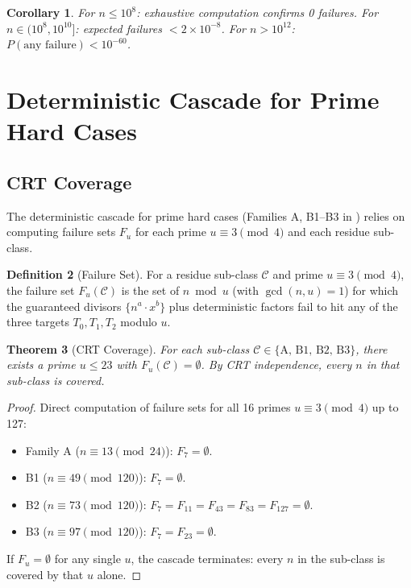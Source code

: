 \documentclass[11pt,a4paper]{article}
\theoremstyle{plain}
\newtheorem{theorem}{Theorem}[section]
\newtheorem{corollary}[theorem]{Corollary}
\theoremstyle{plain}
\theoremstyle{definition}
\newtheorem{definition}[theorem]{Definition}
\numberwithin{equation}{section}
\begin{document}
\begin{corollary}
For $n \leq 10^8$: exhaustive computation confirms 0 failures. For $n \in (10^8, 10^{10}]$: expected failures $< 2 \times 10^{-8}$. For $n > 10^{12}$: $P(\text{any failure}) < 10^{-60}$.
\end{corollary}

\section{Deterministic Cascade for Prime Hard Cases}

\subsection{CRT Coverage}

The deterministic cascade for prime hard cases (Families A, B1--B3 in ) relies on computing failure sets $F_u$ for each prime $u \equiv 3 \pmod{4}$ and each residue sub-class.

\begin{definition}[Failure Set]
For a residue sub-class $\mathcal{C}$ and prime $u \equiv 3 \pmod{4}$, the failure set $F_u(\mathcal{C})$ is the set of $n \bmod u$ (with $\gcd(n, u) = 1$) for which the guaranteed divisors $\{n^a \cdot x^b\}$ plus deterministic factors fail to hit any of the three targets $T_0, T_1, T_2$ modulo $u$.
\end{definition}

\begin{theorem}[CRT Coverage]\label{thm:crt}
For each sub-class $\mathcal{C} \in \{\text{A, B1, B2, B3}\}$, there exists a prime $u \leq 23$ with $F_u(\mathcal{C}) = \emptyset$. By CRT independence, every $n$ in that sub-class is covered.
\end{theorem}

\begin{proof}
Direct computation of failure sets for all 16 primes $u \equiv 3 \pmod{4}$ up to 127:
\begin{itemize}[noitemsep]
  \item Family A ($n \equiv 13 \pmod{24}$): $F_7 = \emptyset$.
  \item B1 ($n \equiv 49 \pmod{120}$): $F_7 = \emptyset$.
  \item B2 ($n \equiv 73 \pmod{120}$): $F_7 = F_{11} = F_{43} = F_{83} = F_{127} = \emptyset$.
  \item B3 ($n \equiv 97 \pmod{120}$): $F_7 = F_{23} = \emptyset$.
\end{itemize}
If $F_u = \emptyset$ for any single $u$, the cascade terminates: every $n$ in the sub-class is covered by that $u$ alone.
\end{proof}
\end{document}
